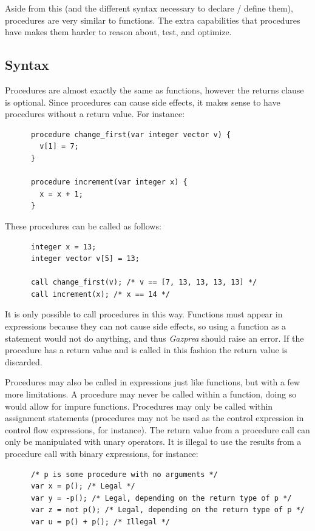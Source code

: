 \documentclass{article}
\begin{document}
  Aside from this (and the different syntax necessary to declare / define them), procedures are very similar to
  functions. The extra capabilities that procedures have makes them harder to reason about, test, and optimize.


  \subsection{Syntax}

    Procedures are almost exactly the same as functions, however the returns clause is optional. Since procedures
    can cause side effects, it makes sense to have procedures without a return value. For instance:

    \begin{lstlisting}
      procedure change_first(var integer vector v) {
        v[1] = 7;
      }

      procedure increment(var integer x) {
        x = x + 1;
      }
    \end{lstlisting}

    These procedures can be called as follows:

    \begin{lstlisting}
      integer x = 13;
      integer vector v[5] = 13;

      call change_first(v); /* v == [7, 13, 13, 13, 13] */
      call increment(x); /* x == 14 */
    \end{lstlisting}

    It is only possible to call procedures in this way. Functions must appear in expressions because they can not
    cause side effects, so using a function as a statement would not do anything, and thus \textit{Gazprea} should
    raise an error. If the procedure has a return value and is called in this fashion the return value is discarded.

    Procedures may also be called in expressions just like functions, but with a few more limitations. A procedure
    may never be called within a function, doing so would allow for impure functions. Procedures may only be called
    within assignment statements (procedures may not be used as the control expression in control flow expressions,
    for instance). The return value from a procedure call can only be manipulated with unary operators. It is
    illegal to use the results from a procedure call with binary expressions, for instance:

    \begin{lstlisting}
      /* p is some procedure with no arguments */
      var x = p(); /* Legal */
      var y = -p(); /* Legal, depending on the return type of p */
      var z = not p(); /* Legal, depending on the return type of p */
      var u = p() + p(); /* Illegal */
    \end{lstlisting}
\end{document}

